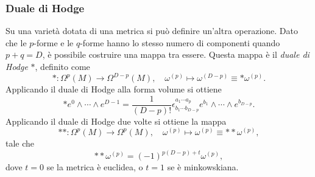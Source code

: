 \subsubsection{Duale di Hodge}
Su una varietà dotata di una metrica si può definire un'altra operazione. Dato che le $p$-forme e le $q$-forme hanno lo stesso numero di componenti quando $p + q = D$, è possibile costruire una mappa tra essere. Questa mappa è il \emph{duale di Hodge} $*$, definito come 
\begin{equation}
    * : \Omega^p(M) \to \Omega^{D - p}(M),\quad \omega^{(p)} \mapsto \omega^{(D - p)} \equiv *\omega^{(p)}.
\end{equation}
Applicando il duale di Hodge alla forma volume si ottiene
\begin{equation}
    *e^0 \wedge \cdots \wedge e^{D - 1} = \frac{1}{(D - p)!}\epsilon^{a_1\cdots a_p}_{b_1\cdots b_{D -p}}e^{b_1}\wedge \cdots \wedge e^{b_{D - p}}.
\end{equation}
Applicando il duale di Hodge due volte si ottiene la mappa 
\begin{equation}
    ** : \Omega^p(M) \to \Omega^p(M),\quad \omega^{(p)} \mapsto \omega^{(p)} \equiv **\omega^{(p)},
\end{equation}
tale che 
\begin{equation}
    **\omega^{(p)} = (-1)^{p(D - p) + t}\omega^{(p)},
\end{equation}
dove $t = 0$ se la metrica è euclidea, o $t = 1$ se è minkowskiana. 

